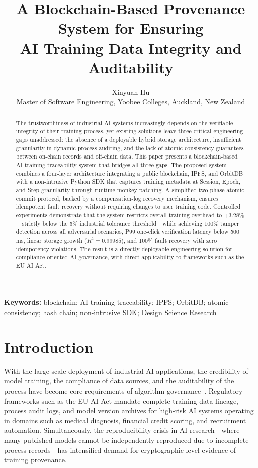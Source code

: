 \documentclass[10pt,twocolumn]{article}
\title{%
  \textbf{A Blockchain-Based Provenance System for Ensuring}\\
  \textbf{AI Training Data Integrity and Auditability}
}
\author{
  Xinyuan Hu\\
  \small Master of Software Engineering, Yoobee Colleges, Auckland, New Zealand
}
\date{}
\begin{document}
\maketitle
\thispagestyle{empty}

\begin{abstract}
The trustworthiness of industrial AI systems increasingly depends on the verifiable integrity
of their training process, yet existing solutions leave three critical engineering gaps
unaddressed: the absence of a deployable hybrid storage architecture, insufficient granularity
in dynamic process auditing, and the lack of atomic consistency guarantees between on-chain
records and off-chain data. This paper presents a blockchain-based AI training traceability
system that bridges all three gaps. The proposed system combines a four-layer architecture
integrating a public blockchain, IPFS, and OrbitDB with a non-intrusive Python SDK that
captures training metadata at Session, Epoch, and Step granularity through runtime
monkey-patching. A simplified two-phase atomic commit protocol, backed by a
compensation-log recovery mechanism, ensures idempotent fault recovery without requiring
changes to user training code. Controlled experiments demonstrate that the system restricts
overall training overhead to $+3.28\%$---strictly below the 5\% industrial tolerance
threshold---while achieving 100\% tamper detection across all adversarial scenarios, P99
one-click verification latency below 500\,ms, linear storage growth ($R^2 = 0.99985$),
and 100\% fault recovery with zero idempotency violations. The result is a directly
deployable engineering solution for compliance-oriented AI governance, with direct
applicability to frameworks such as the EU AI Act.
\end{abstract}

\textbf{Keywords:} blockchain; AI training traceability; IPFS; OrbitDB; atomic consistency;
hash chain; non-intrusive SDK; Design Science Research

\section{Introduction}

With the large-scale deployment of industrial AI applications, the credibility of model
training, the compliance of data sources, and the auditability of the process have become
core requirements of algorithm governance~\cite{soldatos2021}. Regulatory frameworks such
as the EU AI Act mandate complete training data lineage, process audit logs, and model
version archives for high-risk AI systems operating in domains such as medical diagnosis,
financial credit scoring, and recruitment automation. Simultaneously, the reproducibility
crisis in AI research---where many published models cannot be independently reproduced due
to incomplete process records---has intensified demand for cryptographic-level evidence of
training provenance.
\end{document}
